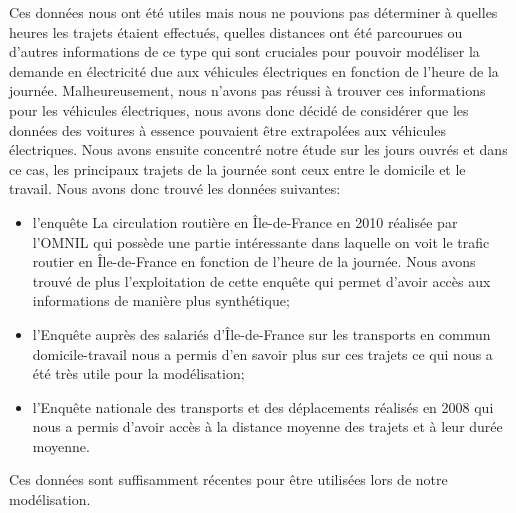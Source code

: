 Ces données nous ont été utiles mais nous ne pouvions pas déterminer à quelles heures les trajets étaient effectués, quelles distances ont été parcourues ou d'autres informations de ce type qui sont cruciales pour pouvoir modéliser la demande en électricité due aux véhicules électriques en fonction de l'heure de la journée. Malheureusement, nous n'avons pas réussi à trouver ces informations pour les véhicules électriques, nous avons donc décidé de considérer que les données des voitures à essence pouvaient être extrapolées aux véhicules électriques. Nous avons ensuite concentré notre étude sur les jours ouvrés et dans ce cas, les principaux trajets de la journée sont ceux entre le domicile et le travail. Nous avons donc trouvé les données suivantes:
\begin{itemize}
	\item l'enquête \og{}La circulation routière en Île-de-France en 2010\fg{} \cite{OMNIL} réalisée par l'OMNIL qui possède une partie intéressante dans laquelle on voit le trafic routier en Île-de-France en fonction de l'heure de la journée. Nous avons trouvé de plus l'exploitation de cette enquête qui permet d'avoir accès aux informations de manière plus synthétique;
	\item l'\og{}Enquête auprès des salariés d'Île-de-France sur les transports en commun domicile-travail\fg{} \cite{ORSTIF} nous a permis d'en savoir plus sur ces trajets ce qui nous a  été très utile pour la modélisation;
	\item l'\og{}Enquête nationale des transports et des déplacements réalisés en 2008\fg{} \cite{enqueteGouv} qui nous a permis d'avoir accès à la distance moyenne des trajets et à leur durée moyenne.
\end{itemize}
\bigskip

Ces données sont suffisamment récentes pour être utilisées lors de notre modélisation.